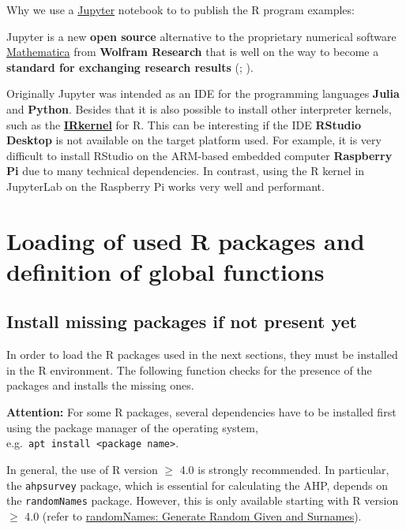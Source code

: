 \documentclass [oneside,10pt,a4paper,ngerman,BCOR10mm,headsepline,parindent,final]{scrartcl}
\begin{document}
Why we use a
\href{https://en.wikipedia.org/wiki/Project_Jupyter}{Jupyter} notebook
to to publish the R program examples:

Jupyter is a new \textbf{open source} alternative to the proprietary
numerical software
\href{https://en.wikipedia.org/wiki/Wolfram_Mathematica}{Mathematica}
from \textbf{Wolfram Research} that is well on the way to become a
\textbf{standard for exchanging research results}
(\cite{Scientific_Paper_obsolete_2018};
\cite{Future_of_Research_Paper_2018}).

Originally Jupyter was intended as an IDE for the programming languages
\textbf{Julia} and \textbf{Python}. Besides that it is also possible to
install other interpreter kernels, such as the
\textbf{\href{https://irkernel.github.io/installation/}{IRkernel}} for
R. This can be interesting if the IDE \textbf{RStudio Desktop} is not
available on the target platform used. For example, it is very difficult
to install RStudio on the ARM-based embedded computer \textbf{Raspberry
Pi} due to many technical dependencies. In contrast, using the R kernel
in JupyterLab on the Raspberry Pi works very well and performant.

    \hypertarget{loading-of-used-r-packages-and-definition-of-global-functions}{%
\section{Loading of used R packages and definition of global
functions}\label{loading-of-used-r-packages-and-definition-of-global-functions}}

\hypertarget{install-missing-packages-if-not-present-yet}{%
\subsection{Install missing packages if not present
yet}\label{install-missing-packages-if-not-present-yet}}

In order to load the R packages used in the next sections, they must be
installed in the R environment. The following function checks for the
presence of the packages and installs the missing ones.

\textbf{Attention:} For some R packages, several dependencies have to be
installed first using the package manager of the operating system,
e.g.~\texttt{apt\ install\ \textless{}package\ name\textgreater{}}.

In general, the use of R version \(\geq\) 4.0 is strongly recommended.
In particular, the \texttt{ahpsurvey} package, which is essential for
calculating the AHP, depends on the \texttt{randomNames} package.
However, this is only available starting with R version \(\geq\) 4.0
(refer to
\href{https://cran.r-project.org/web/packages/randomNames/index.html}{randomNames:
Generate Random Given and Surnames}).
\end{document}
